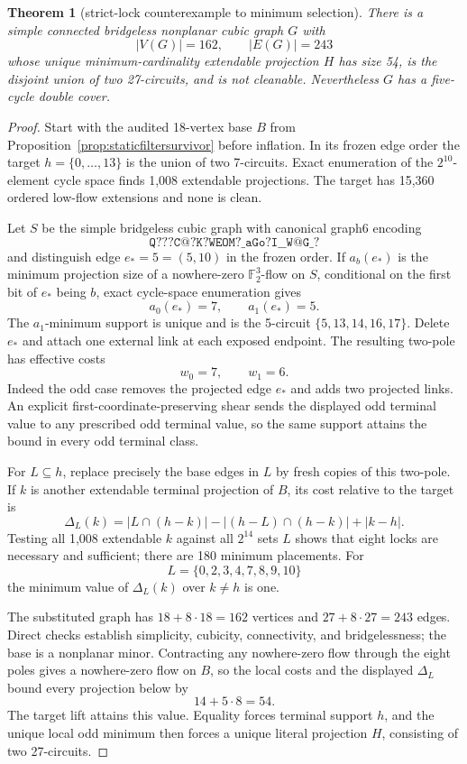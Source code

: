 \documentclass[11pt]{article}
\newtheorem{theorem}{Theorem}[section]
\theoremstyle{definition}
\theoremstyle{remark}
\newcommand{\F}{\mathbb F}
\begin{document}
\begin{theorem}[strict-lock counterexample to minimum selection]
\label{thm:strictlock}
There is a simple connected bridgeless nonplanar cubic graph \(G\) with
\[
                         |V(G)|=162,\qquad |E(G)|=243
\]
whose unique minimum-cardinality extendable projection \(H\) has size
54, is the disjoint union of two 27-circuits, and is not cleanable.
Nevertheless \(G\) has a five-cycle double cover.
\end{theorem}

\begin{proof}
Start with the audited 18-vertex base \(B\) from
Proposition~\ref{prop:staticfiltersurvivor} before inflation.  In its
frozen edge order the target \(h=\{0,\ldots,13\}\) is the union of two
7-circuits.  Exact enumeration of the \(2^{10}\)-element cycle space
finds 1,008 extendable projections.  The target has 15,360 ordered
low-flow extensions and none is clean.

Let \(S\) be the simple bridgeless cubic graph with canonical graph6
encoding
\[
\texttt{Q???C@?K?WEOM?\_aGo?I\_\_W@G\_?}
\]
and distinguish edge \(e_\ast=5=(5,10)\) in the frozen order.  If
\(a_b(e_\ast)\) is the minimum projection size of a nowhere-zero
\(\F_2^3\)-flow on \(S\), conditional on the first bit of \(e_\ast\)
being \(b\), exact cycle-space enumeration gives
\[
                         a_0(e_\ast)=7,\qquad a_1(e_\ast)=5.
\]
The \(a_1\)-minimum support is unique and is the 5-circuit
\(\{5,13,14,16,17\}\).  Delete \(e_\ast\) and attach one external link
at each exposed endpoint.  The resulting two-pole has effective costs
\[
                              w_0=7,\qquad w_1=6.
\]
Indeed the odd case removes the projected edge \(e_\ast\) and adds two
projected links.  An explicit first-coordinate-preserving shear sends
the displayed odd terminal value to any prescribed odd terminal value,
so the same support attains the bound in every odd terminal class.

For \(L\subseteq h\), replace precisely the base edges in \(L\) by fresh
copies of this two-pole.  If \(k\) is another extendable terminal
projection of \(B\), its cost relative to the target is
\[
 \Delta_L(k)=
 |L\cap(h-k)|-|(h-L)\cap(h-k)|+|k-h|.
\]
Testing all 1,008 extendable \(k\) against all \(2^{14}\) sets \(L\)
shows that eight locks are necessary and sufficient; there are 180
minimum placements.  For
\[
                         L=\{0,2,3,4,7,8,9,10\}
\]
the minimum value of \(\Delta_L(k)\) over \(k\ne h\) is one.

The substituted graph has \(18+8\cdot18=162\) vertices and
\(27+8\cdot27=243\) edges.  Direct checks establish simplicity,
cubicity, connectivity, and bridgelessness; the base is a nonplanar
minor.  Contracting any nowhere-zero flow through the eight poles gives
a nowhere-zero flow on \(B\), so the local costs and the displayed
\(\Delta_L\) bound every projection below by
\[
                              14+5\cdot8=54.
\]
The target lift attains this value.  Equality forces terminal support
\(h\), and the unique local odd minimum then forces a unique literal
projection \(H\), consisting of two 27-circuits.


\end{proof}
\end{document}

